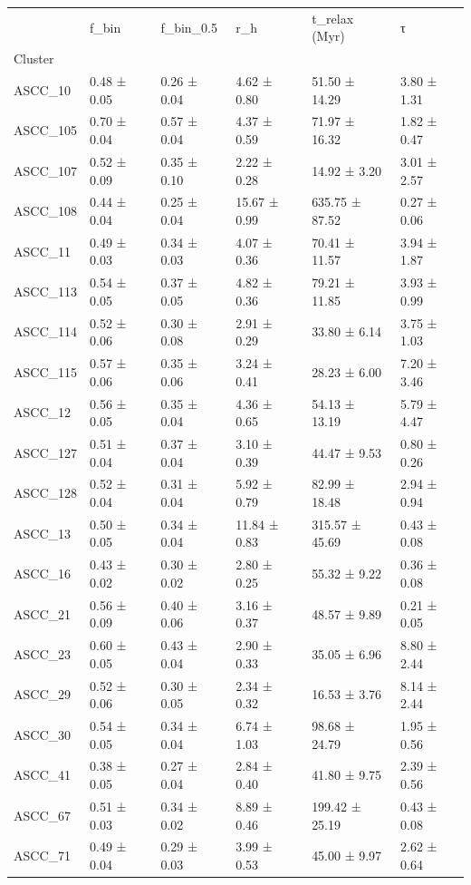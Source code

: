 \begin{tabular}{llllll}
\toprule
 & f_bin & f_bin_0.5 & r_h & t_relax (Myr) & τ \\
Cluster &  &  &  &  &  \\
\midrule
ASCC_10 & 0.48 ± 0.05 & 0.26 ± 0.04 & 4.62 ± 0.80 & 51.50 ± 14.29 & 3.80 ± 1.31 \\
ASCC_105 & 0.70 ± 0.04 & 0.57 ± 0.04 & 4.37 ± 0.59 & 71.97 ± 16.32 & 1.82 ± 0.47 \\
ASCC_107 & 0.52 ± 0.09 & 0.35 ± 0.10 & 2.22 ± 0.28 & 14.92 ± 3.20 & 3.01 ± 2.57 \\
ASCC_108 & 0.44 ± 0.04 & 0.25 ± 0.04 & 15.67 ± 0.99 & 635.75 ± 87.52 & 0.27 ± 0.06 \\
ASCC_11 & 0.49 ± 0.03 & 0.34 ± 0.03 & 4.07 ± 0.36 & 70.41 ± 11.57 & 3.94 ± 1.87 \\
ASCC_113 & 0.54 ± 0.05 & 0.37 ± 0.05 & 4.82 ± 0.36 & 79.21 ± 11.85 & 3.93 ± 0.99 \\
ASCC_114 & 0.52 ± 0.06 & 0.30 ± 0.08 & 2.91 ± 0.29 & 33.80 ± 6.14 & 3.75 ± 1.03 \\
ASCC_115 & 0.57 ± 0.06 & 0.35 ± 0.06 & 3.24 ± 0.41 & 28.23 ± 6.00 & 7.20 ± 3.46 \\
ASCC_12 & 0.56 ± 0.05 & 0.35 ± 0.04 & 4.36 ± 0.65 & 54.13 ± 13.19 & 5.79 ± 4.47 \\
ASCC_127 & 0.51 ± 0.04 & 0.37 ± 0.04 & 3.10 ± 0.39 & 44.47 ± 9.53 & 0.80 ± 0.26 \\
ASCC_128 & 0.52 ± 0.04 & 0.31 ± 0.04 & 5.92 ± 0.79 & 82.99 ± 18.48 & 2.94 ± 0.94 \\
ASCC_13 & 0.50 ± 0.05 & 0.34 ± 0.04 & 11.84 ± 0.83 & 315.57 ± 45.69 & 0.43 ± 0.08 \\
ASCC_16 & 0.43 ± 0.02 & 0.30 ± 0.02 & 2.80 ± 0.25 & 55.32 ± 9.22 & 0.36 ± 0.08 \\
ASCC_21 & 0.56 ± 0.09 & 0.40 ± 0.06 & 3.16 ± 0.37 & 48.57 ± 9.89 & 0.21 ± 0.05 \\
ASCC_23 & 0.60 ± 0.05 & 0.43 ± 0.04 & 2.90 ± 0.33 & 35.05 ± 6.96 & 8.80 ± 2.44 \\
ASCC_29 & 0.52 ± 0.06 & 0.30 ± 0.05 & 2.34 ± 0.32 & 16.53 ± 3.76 & 8.14 ± 2.44 \\
ASCC_30 & 0.54 ± 0.05 & 0.34 ± 0.04 & 6.74 ± 1.03 & 98.68 ± 24.79 & 1.95 ± 0.56 \\
ASCC_41 & 0.38 ± 0.05 & 0.27 ± 0.04 & 2.84 ± 0.40 & 41.80 ± 9.75 & 2.39 ± 0.56 \\
ASCC_67 & 0.51 ± 0.03 & 0.34 ± 0.02 & 8.89 ± 0.46 & 199.42 ± 25.19 & 0.43 ± 0.08 \\
ASCC_71 & 0.49 ± 0.04 & 0.29 ± 0.03 & 3.99 ± 0.53 & 45.00 ± 9.97 & 2.62 ± 0.64 \\

\end{tabular}
